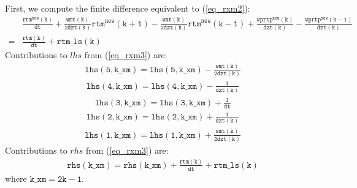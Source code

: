 \documentclass[11pt,fleqn]{article}
\begin{document}
First, we compute
the finite difference equivalent to (\ref{eq_rxm2}):
%
\begin{equation}
\label{eq_rxm3}
\begin{split}
& \mathtt{
   \frac{rtm^{new}(k)}{dt}
   + \frac{wmt(k)}{2dzt(k)} rtm^{new}(k+1)
   - \frac{wmt(k)}{2dzt(k)} rtm^{new}(k-1)
   + \frac{wprtp^{new}(k)}{dzt(k)}
   - \frac{wprtp^{new}(k-1)}{dzt(k)} } \\
=& \mathtt{
   \frac{rtm(k)}{dt} + rtm\_ls(k)
  }
\end{split}
\end{equation}
%
Contributions to $lhs$ from (\ref{eq_rxm3}) are:
%
\begin{equation}
\begin{split}
& \mathtt{
  lhs(5,k\_xm) = lhs(5,k\_xm) - \frac{wmt(k)}{2dzt(k)}
  }
\end{split}
\end{equation}
%
\begin{equation}
\begin{split}
& \mathtt{
  lhs(4,k\_xm) = lhs(4,k\_xm) - \frac{1}{dzt(k)}
  }
\end{split}
\end{equation}
%
\begin{equation}
\begin{split}
& \mathtt{
  lhs(3,k\_xm) = lhs(3,k\_xm) + \frac{1}{dt}
  }
\end{split}
\end{equation}
%
\begin{equation}
\begin{split}
& \mathtt{
  lhs(2,k\_xm) = lhs(2,k\_xm) + \frac{1}{dzt(k)}
  }
\end{split}
\end{equation}
%
\begin{equation}
\begin{split}
& \mathtt{
  lhs(1,k\_xm) = lhs(1,k\_xm) + \frac{wmt(k)}{2dzt(k)}
  }
\end{split}
\end{equation}
%
Contributions to $rhs$ from (\ref{eq_rxm3}) are:
%
\begin{equation}
\begin{split}
& \mathtt{
  rhs(k\_xm) = rhs(k\_xm) + \frac{rtm(k)}{dt} + rtm\_ls(k)
  }
\end{split}
\end{equation}
%
where $\mathtt{k\_xm = 2 k - 1}$.
\end{document}
